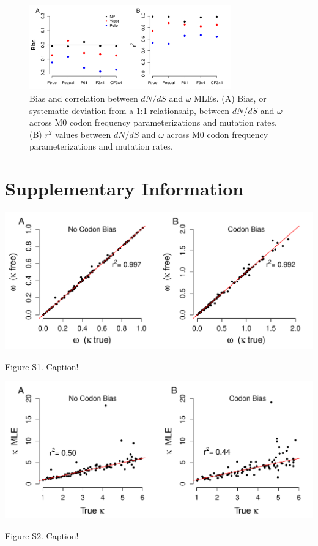 \documentclass{pnastwo}
\begin{document}
\bigskip
\bigskip
\bigskip
\bigskip

\begin{figure}[H]
\centerline{\includegraphics[width=8.7cm]{figures/MainText/nyp_bias_r2.pdf}}
\caption{\label{nyp_bias_r2} Bias and correlation between $dN/dS$ and $\omega$ MLEs. (A) Bias, or systematic deviation from a 1:1 relationship, between $dN/dS$ and $\omega$ across M0 codon frequency parameterizations and mutation rates. (B) $r^2$ values between $dN/dS$ and $\omega$ across M0 codon frequency parameterizations and mutation rates.}
\end{figure}

\clearpage
\newpage

\section{Supplementary Information}

\bigskip
\bigskip
\bigskip
\bigskip

\centerline{\includegraphics[width=5.5in]{figures/SI/omega_kappafree_kappatrue.pdf}}
\noindent Figure S1. Caption!

\bigskip
\bigskip
\bigskip
\bigskip


\centerline{\includegraphics[width=5.5in]{figures/SI/kappa_regressions.pdf}}
\noindent Figure S2. Caption!
\end{document}
